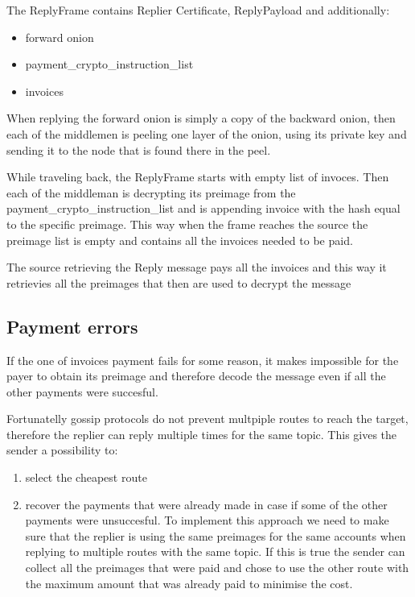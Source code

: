 \documentclass{article}
\begin{document}
The ReplyFrame contains Replier Certificate, ReplyPayload and additionally:

\begin{itemize}
	\item  forward onion
	\item  payment\_crypto\_instruction\_list
	\item  invoices
\end{itemize}

When replying the forward onion is simply a copy of the backward onion, then each of the middlemen is peeling one layer of the onion, using its private key and sending it to the node that is found there in the peel.

While traveling back, the ReplyFrame starts with empty list of invoces. Then each of the middleman is decrypting  its preimage from the payment\_crypto\_instruction\_list and is appending invoice with the hash equal to the specific preimage. This way when the frame reaches the source the preimage list is empty and contains all the invoices needed to be paid.

The source retrieving the Reply message pays all the invoices and this way it retrievies all the preimages that then are used to decrypt the message

\subsection{Payment errors}

If the one of invoices payment fails for some reason, it makes impossible for the payer to obtain its preimage and therefore decode the message even if all the other payments were succesful.

Fortunatelly gossip protocols do not prevent multpiple routes to reach the target, therefore the replier can reply multiple times for the same topic. This gives the sender a possibility to:

\begin{enumerate}
	\item select the cheapest route
	\item recover the payments that were already made in case if some of the other payments were unsuccesful. To implement this approach we need to make sure that the replier is using the same preimages for the same accounts when replying to multiple routes with the same topic. If this is true the sender can collect all the preimages that were paid and chose to use the other route with the maximum amount that was already paid to minimise the cost.
\end{enumerate}
\end{document}
